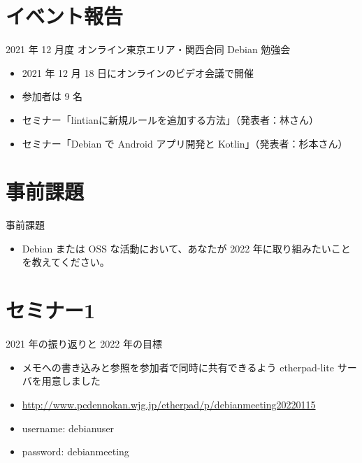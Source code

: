 \section{イベント報告}

\begin{frame}{2021 年 12 月度 オンライン東京エリア・関西合同 Debian 勉強会}
\begin{itemize}
\item 2021 年 12 月 18 日にオンラインのビデオ会議で開催
\item 参加者は 9 名
\item セミナー「lintianに新規ルールを追加する方法」（発表者：林さん）
\item セミナー「Debian で Android アプリ開発と Kotlin」（発表者：杉本さん）
\end{itemize}
\end{frame}


\section{事前課題}


\begin{frame}{事前課題}
  \begin{itemize}
  \item Debian または OSS な活動において、あなたが 2022 年に取り組みたいことを教えてください。
\end{itemize}
\end{frame}

{\footnotesize
 
}

%

\section{セミナー1}


\begin{frame}{2021 年の振り返りと 2022 年の目標}
\begin{itemize}
\item メモへの書き込みと参照を参加者で同時に共有できるよう etherpad-lite サーバを用意しました
\item \url{http://www.pcdennokan.wjg.jp/etherpad/p/debianmeeting20220115}
\item username: debianuser
\item password: debianmeeting
\end{itemize}
\end{frame}


